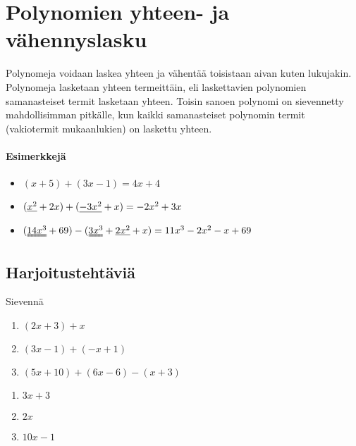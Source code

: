 \chapter{Polynomien yhteen- ja vähennyslasku}

Polynomeja voidaan laskea yhteen ja vähentää toisistaan aivan kuten lukujakin.
Polynomeja lasketaan yhteen termeittäin, eli laskettavien polynomien
samanasteiset termit lasketaan yhteen. Toisin sanoen polynomi on sievennetty
mahdollisimman pitkälle, kun kaikki samanasteiset polynomin termit
(vakiotermit mukaanlukien) on laskettu yhteen.

\subsubsection*{Esimerkkejä}
\begin{itemize}
    \item $(x+5) + (3x-1) = 4x + 4$
    \item $(\uline{x^2} + 2x) + (\uline{-3x^2} + x) = -2x^2 + 3x$
    \item $(\uuline{14x^3} + 69) - (\uuline{3x^3} + \uline{2x^2} + x) = 11x^3 - 2x^2 - x +69$
\end{itemize}

\section{Harjoitustehtäviä}

\begin{tehtava}
    Sievennä
    \begin{enumerate}
        \item $(2x + 3) + x $
        \item $(3x - 1) + (-x + 1)$
        \item $(5x + 10) + (6x - 6) - (x + 3)$
    \end{enumerate}
    \begin{vastaus}
        \begin{enumerate}
            \item $3x + 3$
            \item $2x$
            \item $10x - 1$
        \end{enumerate}
    \end{vastaus}
\end{tehtava}

